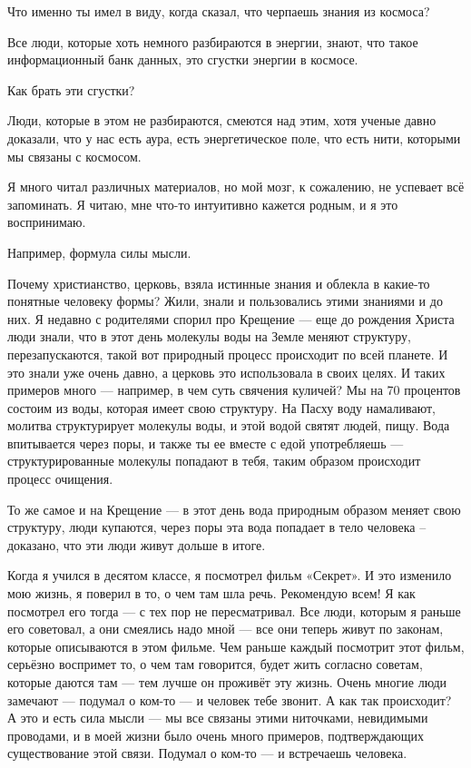 Что именно ты имел в виду, когда сказал, что черпаешь знания из космоса?

Все люди, которые хоть немного разбираются в энергии, знают, что такое
информационный банк данных, это сгустки энергии в космосе.

Как брать эти сгустки?

Люди, которые в этом не разбираются, смеются над этим, хотя ученые давно
доказали, что у нас есть аура, есть энергетическое поле, что есть нити,
которыми мы связаны с космосом. 

Я много читал различных материалов, но мой мозг, к сожалению, не успевает всё
запоминать. Я читаю, мне что-то интуитивно кажется родным, и я это воспринимаю.

Например, формула силы мысли.

Почему христианство, церковь, взяла истинные знания и облекла в какие-то
понятные человеку формы? Жили, знали и пользовались этими знаниями и до них. Я
недавно с родителями спорил про Крещение --- еще до рождения Христа люди знали,
что в этот день молекулы воды на Земле меняют структуру, перезапускаются, такой
вот природный процесс происходит по всей планете. И это знали уже очень давно,
а церковь это использовала в своих целях. И таких примеров много --- например, в
чем суть свячения куличей? Мы на 70 процентов состоим из воды, которая имеет
свою структуру. На Пасху воду намаливают, молитва структурирует молекулы воды,
и этой водой святят людей, пищу. Вода впитывается через поры, и также ты ее
вместе с едой употребляешь --- структурированные молекулы попадают в тебя, таким
образом происходит процесс очищения.

То же самое и на Крещение --- в этот день вода природным образом меняет свою
структуру, люди купаются, через поры эта вода попадает в тело человека –
доказано, что эти люди живут дольше в итоге.

Когда я учился в десятом классе, я посмотрел фильм «Секрет». И это изменило мою
жизнь, я поверил в то, о чем там шла речь. Рекомендую всем! Я как посмотрел его
тогда --- с тех пор не пересматривал. Все люди, которым я раньше его советовал, а
они смеялись надо мной --- все они теперь живут по законам, которые описываются в
этом фильме. Чем раньше каждый посмотрит этот фильм, серьёзно воспримет то, о
чем там говорится, будет жить согласно советам, которые даются там --- тем лучше
он проживёт эту жизнь. Очень многие люди замечают --- подумал о ком-то --- и
человек тебе звонит. А как так происходит? А это и есть сила мысли --- мы все
связаны этими ниточками, невидимыми проводами, и в моей жизни было очень много
примеров, подтверждающих существование этой связи. Подумал о ком-то --- и
встречаешь человека.

